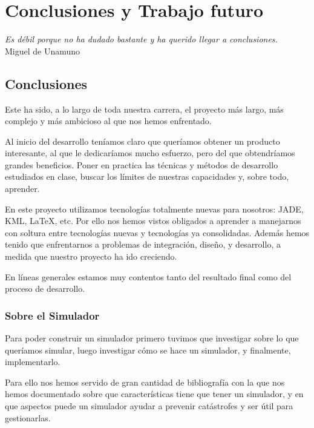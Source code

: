 \chapter*{Conclusiones y Trabajo futuro} \label{cap7}

\begin{flushright}
\begin{minipage}{7.85cm}
    {\em Es débil porque no ha dudado bastante y ha querido llegar a
    conclusiones.} \\ Miguel de Unamuno
\end{minipage}
\end{flushright}

\vspace*{5mm}

\section*{Conclusiones}

Este ha sido, a lo largo de toda nuestra carrera, el proyecto más largo, más
complejo y más ambicioso al que nos hemos enfrentado.

Al inicio del desarrollo teníamos claro que queríamos obtener un producto
interesante, al que le dedicaríamos mucho esfuerzo, pero del que obtendríamos
grandes beneficios. Poner en practica las técnicas y métodos de desarrollo
estudiados en clase, buscar los límites de nuestras capacidades y, sobre todo,
aprender.

En este proyecto utilizamos tecnologías totalmente nuevas para nosotros: JADE,
KML, \LaTeX{}, etc. Por ello nos hemos vistos obligados a aprender a manejarnos
con soltura entre tecnologías nuevas y tecnologías ya consolidadas. Además hemos
tenido que enfrentarnos a problemas de integración, diseño, y desarrollo, a
medida que nuestro proyecto ha ido creciendo.

En líneas generales estamos muy contentos tanto del resultado final como del
proceso de desarrollo.

\subsection*{Sobre el Simulador}

Para poder construir un simulador primero tuvimos que investigar sobre lo
que queríamos simular, luego investigar cómo se hace un simulador, y
finalmente, implementarlo.

Para ello nos hemos servido de gran cantidad de bibliografía con la que nos
hemos documentado sobre que características tiene que tener un simulador, y en
que aspectos puede un simulador ayudar a prevenir catástrofes y ser útil para
gestionarlas.

